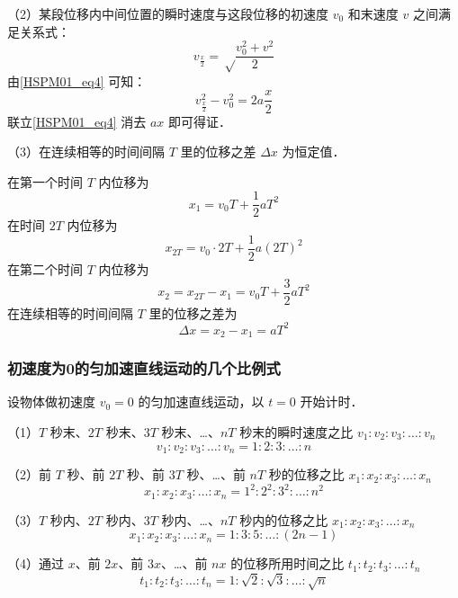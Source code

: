 （2）某段位移内中间位置的瞬时速度与这段位移的初速度 $v_0$ 和末速度 $v$ 之间满足关系式：
\begin{equation}
v_\frac x2=\sqrt \frac{v_0^2+v^2}2
\end{equation}
由\autoref{HSPM01_eq4} 可知：
\begin{equation}
v_{\frac x2}^2-v_0^2=2a\frac x2
\end{equation}
联立\autoref{HSPM01_eq4} 消去 $ax$ 即可得证．

（3）在连续相等的时间间隔 $T$ 里的位移之差 $\Delta x$ 为恒定值．

在第一个时间 $T$ 内位移为
\begin{equation}
x_1=v_0T+\frac12aT^2
\end{equation}
在时间 $2T$ 内位移为
\begin{equation}
x_{2T}=v_0\cdot2T+\frac12a(2T)^2
\end{equation}
在第二个时间 $T$ 内位移为
\begin{equation}
x_2=x_{2T}-x_1=v_0T+\frac32aT^2
\end{equation}
在连续相等的时间间隔 $T$ 里的位移之差为
\begin{equation}
\Delta x=x_2-x_1=aT^2
\end{equation}

\subsubsection{初速度为0的匀加速直线运动的几个比例式}
设物体做初速度 $v_0=0$ 的匀加速直线运动，以 $t=0$ 开始计时．

（1）$T$ 秒末、$2T$ 秒末、$3T$ 秒末、…、$nT$ 秒末的瞬时速度之比 $v_1:v_2:v_3:\dots:v_n$
\begin{equation}
v_1:v_2:v_3:\dots:v_n=1:2:3:\dots:n
\end{equation}

（2）前 $T$ 秒、前 $2T$ 秒、前 $3T$ 秒、…、前 $nT$ 秒的位移之比 $x_1:x_2:x_3:\dots:x_n$
\begin{equation}
x_1:x_2:x_3:\dots:x_n=1^2:2^2:3^2:\dots:n^2
\end{equation}

（3）$T$ 秒内、$2T$ 秒内、$3T$ 秒内、…、$nT$ 秒内的位移之比 $x_1:x_2:x_3:\dots:x_n$
\begin{equation}
x_1:x_2:x_3:\dots:x_n=1:3:5:\dots:(2n-1)
\end{equation}

（4）通过 $x$、前 $2x$、前 $3x$、…、前 $nx$ 的位移所用时间之比 $t_1:t_2:t_3:\dots:t_n$
\begin{equation}
t_1:t_2:t_3:\dots:t_n=1:\sqrt{2}:\sqrt{3}:\dots:\sqrt{n}
\end{equation}

